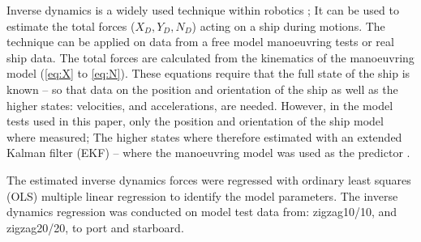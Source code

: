 Inverse dynamics is a widely used technique within robotics \citep{faber_inverse_2018}; It can be used to estimate the total forces ($X_D,Y_D,N_D$) acting on a ship during motions. The technique can be applied on data from a free model manoeuvring tests or real ship data. The total forces are calculated from the kinematics of the manoeuvring model (\autoref{eq:X} to \autoref{eq:N}). These equations require that the full state of the ship is known -- so that data on the position and orientation of the ship as well as the higher states: velocities, and accelerations, are needed.
However, in the model tests used in this paper, only the position and orientation of the ship model where measured;
The higher states where therefore estimated with an extended Kalman filter (EKF) -- where the manoeuvring model was used as the predictor \citep{alexandersson_wpcc_2022}.

The estimated inverse dynamics forces were regressed with ordinary least squares (OLS) multiple
linear regression to identify the model parameters. The inverse dynamics regression was conducted on model test data from: zigzag10/10, and zigzag20/20, to port and starboard.  